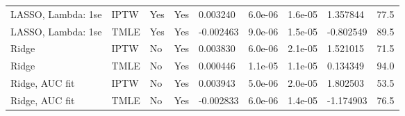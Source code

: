 \begin{longtable}[l]{lllllllll}
LASSO, Lambda: 1se & IPTW & Yes & Yes & 0.003240 & 6.0e-06 & 1.6e-05 & 1.357844 & 77.5\\
LASSO, Lambda: 1se & TMLE & Yes & Yes & -0.002463 & 9.0e-06 & 1.5e-05 & -0.802549 & 89.5\\
Ridge & IPTW & No & Yes & 0.003830 & 6.0e-06 & 2.1e-05 & 1.521015 & 71.5\\
Ridge & TMLE & No & Yes & 0.000446 & 1.1e-05 & 1.1e-05 & 0.134349 & 94.0\\
Ridge, AUC fit & IPTW & No & Yes & 0.003943 & 5.0e-06 & 2.0e-05 & 1.802503 & 53.5\\
Ridge, AUC fit & TMLE & No & Yes & -0.002833 & 6.0e-06 & 1.4e-05 & -1.174903 & 76.5\\
\bottomrule
\end{longtable}
